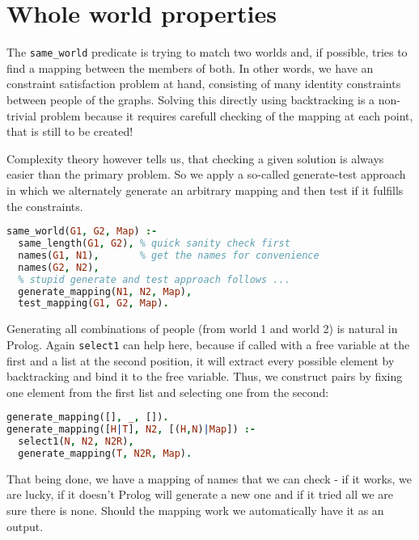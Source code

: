 \documentclass{article}
\begin{document}
\section{Whole world properties}

The \texttt{same\_world} predicate is trying to match two worlds and, if possible,
tries to find a mapping between the members of both. In other words, we have an
constraint satisfaction problem at hand, consisting of many identity constraints
between people of the graphs.
Solving this directly using backtracking is a non-trivial problem because it
requires carefull checking of the mapping at each point, that is still to be created!

Complexity theory however tells us, that checking a given solution is always easier
than the primary problem. So we apply a so-called generate-test approach in which
we alternately generate an arbitrary mapping and then test if it fulfills the constraints.

\begin{lstlisting}[language=Prolog]
same_world(G1, G2, Map) :-
  same_length(G1, G2), % quick sanity check first
  names(G1, N1),       % get the names for convenience
  names(G2, N2),
  % stupid generate and test approach follows ...
  generate_mapping(N1, N2, Map),
  test_mapping(G1, G2, Map).
\end{lstlisting}


Generating all combinations of people (from world 1 and world 2) is natural in
Prolog. Again \texttt{select1} can help here, because if called with a free variable
at the first and a list at the second position, it will extract every possible
element by backtracking and bind it to the free variable. Thus, we construct pairs by
fixing one element from the first list and selecting one from the second:

\begin{lstlisting}[language=Prolog]
generate_mapping([], _, []).
generate_mapping([H|T], N2, [(H,N)|Map]) :-
  select1(N, N2, N2R),
  generate_mapping(T, N2R, Map).
\end{lstlisting}

That being done, we have a mapping of names that we can check - if it works, we
are lucky, if it doesn't Prolog will generate a new one and if it tried all we are
sure there is none. Should the mapping work we automatically have it as an output.
\end{document}

